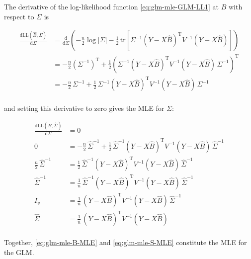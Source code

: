 \documentclass[a4paper,12pt,twoside]{book}
\begin{document}
\vspace{1em}
The derivative of the log-likelihood function \eqref{eq:glm-mle-GLM-LL1} at $\hat{B}$ with respect to $\Sigma$ is

\begin{equation} \label{eq:glm-mle-dLL-dS}
\begin{split}
\frac{\mathrm{d}\mathrm{LL}(\hat{B},\Sigma)}{\mathrm{d}\Sigma} &= \frac{\mathrm{d}}{\mathrm{d}\Sigma} \left( - \frac{n}{2} \log |\Sigma| - \frac{1}{2} \, \mathrm{tr}\left[ \Sigma^{-1} (Y - X\hat{B})^\mathrm{T} V^{-1} (Y - X\hat{B}) \right] \right) \\
&= - \frac{n}{2} \left( \Sigma^{-1} \right)^\mathrm{T} + \frac{1}{2} \left( \Sigma^{-1} (Y - X\hat{B})^\mathrm{T} V^{-1} (Y - X\hat{B}) \, \Sigma^{-1} \right)^\mathrm{T} \\
&= - \frac{n}{2} \, \Sigma^{-1} + \frac{1}{2} \, \Sigma^{-1} (Y - X\hat{B})^\mathrm{T} V^{-1} (Y - X\hat{B}) \, \Sigma^{-1} \\
\end{split}
\end{equation}

and setting this derivative to zero gives the MLE for $\Sigma$:

\begin{equation} \label{eq:glm-mle-S-MLE}
\begin{split}
\frac{\mathrm{d}\mathrm{LL}(\hat{B},\hat{\Sigma})}{\mathrm{d}\Sigma} &= 0 \\
0 &= - \frac{n}{2} \, \hat{\Sigma}^{-1} + \frac{1}{2} \, \hat{\Sigma}^{-1} (Y - X\hat{B})^\mathrm{T} V^{-1} (Y - X\hat{B}) \, \hat{\Sigma}^{-1} \\
\frac{n}{2} \, \hat{\Sigma}^{-1} &= \frac{1}{2} \, \hat{\Sigma}^{-1} (Y - X\hat{B})^\mathrm{T} V^{-1} (Y - X\hat{B}) \, \hat{\Sigma}^{-1} \\
\hat{\Sigma}^{-1} &= \frac{1}{n} \, \hat{\Sigma}^{-1} (Y - X\hat{B})^\mathrm{T} V^{-1} (Y - X\hat{B}) \, \hat{\Sigma}^{-1} \\
I_v &= \frac{1}{n} \, (Y - X\hat{B})^\mathrm{T} V^{-1} (Y - X\hat{B}) \, \hat{\Sigma}^{-1} \\
\hat{\Sigma} &= \frac{1}{n} \, (Y - X\hat{B})^\mathrm{T} V^{-1} (Y - X\hat{B}) \\
\end{split}
\end{equation}

\vspace{1em}
Together, \eqref{eq:glm-mle-B-MLE} and \eqref{eq:glm-mle-S-MLE} constitute the MLE for the GLM.
\end{document}
